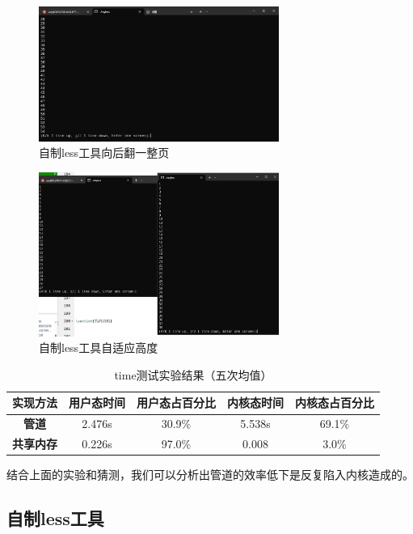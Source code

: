\documentclass[lang=cn,a4paper,newtx]{elegantpaper}
\begin{document}
\begin{figure}[!htb]
    \centering
    \includegraphics[width=0.7\textwidth]{image/less_enter.png}
    \caption{自制less工具向后翻一整页}
    \label{fig:less_enter}
\end{figure}
\begin{figure}[!htb]
    \centering
    \includegraphics[width=0.7\textwidth]{image/less_diff_height.png}
    \caption{自制less工具自适应高度}
    \label{fig:less_diff_height}
\end{figure}
\begin{table}[htbp]
\caption{time测试实验结果（五次均值）}
\label{table:res_time}
\centering
\begin{tabular}{ccccc}
\hline
\textbf{实现方法} & \textbf{用户态时间} & \textbf{用户态占百分比} & \textbf{内核态时间} & \textbf{内核态占百分比} \\ \hline
\textbf{管道}   & 2.476s         & 30.9\%            & 5.538s         & 69.1\%            \\
\textbf{共享内存} & 0.226s         & 97.0\%            & 0.008          & 3.0\%             \\ \hline
\end{tabular}
\end{table}

结合上面的实验和猜测，我们可以分析出管道的效率低下是反复陷入内核造成的。

\subsection{自制less工具}
\end{document}
